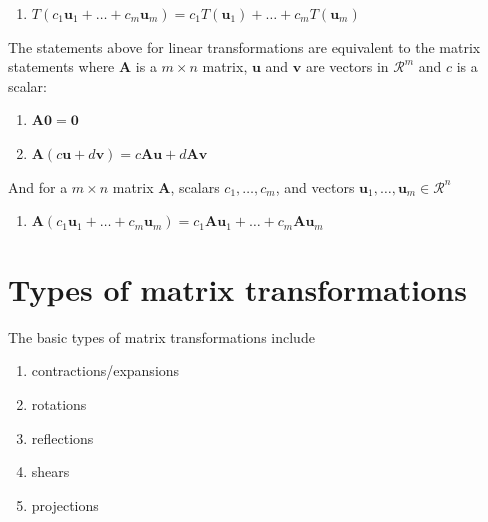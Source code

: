 \documentclass[
]{book}
\providecommand{\tightlist}{%
  \setlength{\itemsep}{0pt}\setlength{\parskip}{0pt}}
\theoremstyle{definition}
\theoremstyle{definition}
\theoremstyle{definition}
\theoremstyle{definition}
\theoremstyle{remark}
\begin{document}
\begin{enumerate}
\def\labelenumi{\arabic{enumi})}
\setcounter{enumi}{4}
\tightlist
\item
  \(T(c_1 \mathbf{u}_1 + \ldots + c_m \mathbf{u}_m) = c_1 T(\mathbf{u}_1) + \ldots + c_m T(\mathbf{u}_m)\)
\end{enumerate}

The statements above for linear transformations are equivalent to the matrix statements where \(\mathbf{A}\) is a \(m \times n\) matrix, \(\mathbf{u}\) and \(\mathbf{v}\) are vectors in \(\mathcal{R}^m\) and \(c\) is a scalar:

\begin{enumerate}
\def\labelenumi{\arabic{enumi})}
\setcounter{enumi}{2}
\tightlist
\item
  \(\mathbf{A} \mathbf{0} = \mathbf{0}\)
\item
  \(\mathbf{A}(c \mathbf{u} + d \mathbf{v}) = c \mathbf{A} \mathbf{u} + d \mathbf{A} \mathbf{v}\)
\end{enumerate}

And for a \(m \times n\) matrix \(\mathbf{A}\), scalars \(c_1, \ldots, c_m\), and vectors \(\mathbf{u}_1, \ldots, \mathbf{u}_m \in \mathcal{R}^n\)

\begin{enumerate}
\def\labelenumi{\arabic{enumi})}
\setcounter{enumi}{4}
\tightlist
\item
  \(\mathbf{A}(c_1 \mathbf{u}_1 + \ldots + c_m \mathbf{u}_m) = c_1 \mathbf{A}\mathbf{u}_1 + \ldots + c_m \mathbf{A} \mathbf{u}_m\)
\end{enumerate}

\hypertarget{types-of-matrix-transformations}{%
\section{Types of matrix transformations}\label{types-of-matrix-transformations}}

The basic types of matrix transformations include

\begin{enumerate}
\def\labelenumi{\arabic{enumi})}
\tightlist
\item
  contractions/expansions
\item
  rotations
\item
  reflections
\item
  shears
\item
  projections
\end{enumerate}
\end{document}
